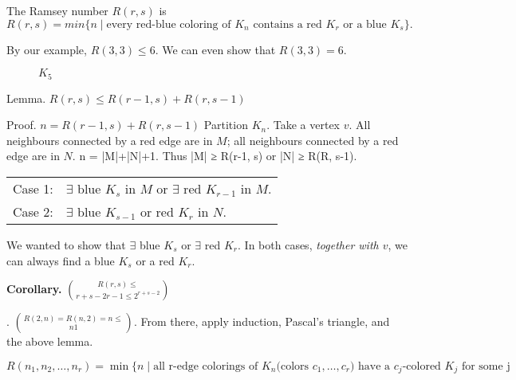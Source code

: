 
\begin{definition}
The Ramsey number $R(r,s)$ is
\[
    R(r,s) =
        min \{n\mid \text{every red-blue coloring of $K_n$ contains a red $K_r$ or a blue $K_s$}\}.
\]
\end{definition}

By our example, $R(3,3) ≤ 6$. We can even show that $R(3,3) = 6$.

\begin{figure}[htb]
  \centering
  \caption{$K_5$}
\end{figure}

Lemma. $R(r,s) ≤ R(r-1, s) + R(r, s-1)$

Proof. $n = R(r-1, s) + R(r, s-1)$
Partition $K_n$. Take a vertex $v$. All neighbours connected by a red edge are in $M$; all neighbours connected by a red edge are in $N$.
n = |M|+|N|+1. Thus
|M| ≥ R(r-1, s) or |N| ≥ R(R, s-1).

\begin{tabular}{ll}
  Case 1: & $\exists$ blue $K_s$ in $M$ or $\exists$ red $K_{r-1}$ in $M$. \\
  Case 2: & $\exists$ blue $K_{s-1}$ or red $K_r$ in $N$.
\end{tabular}

We wanted to show that $\exists$ blue $K_s$ or $\exists$ red $K_r$.
In both cases, \emph{together with $v$}, we can always find a blue $K_s$ or a red $K_r$.

\textbf{Corollary.} $R(r,s) ≤ \choose{r+s-2}{r-1} ≤ 2^{r+s-2}$

\Proof. $R(2,n) = R(n,2) = n ≤ \choose{n}{1}$. From there, apply induction, Pascal's triangle, and the above lemma.

\begin{definition}
\[
    R(n_1,n_2,\ldots,n_r) =
    \min \{ n \mid
        \text{all r-edge colorings of $K_n$
        (colors $c_1,\ldots,c_r$) have a
        $c_j$-colored $K_j$ for some j}
\]
\end{definition}











